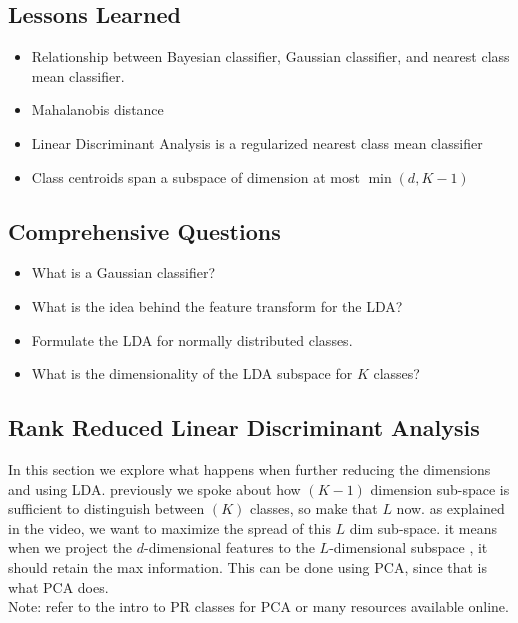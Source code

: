   \subsection{Lessons Learned}
\begin{itemize}
    \item Relationship between Bayesian classifier, Gaussian classifier, and nearest class mean classifier. 
    \item Mahalanobis distance 
    \item Linear Discriminant Analysis is a regularized nearest class mean classifier 
    \item Class centroids span a subspace of dimension at most $\min(d,K-1)$ 
  \end{itemize}
  
  \subsection{Comprehensive Questions}
  \begin{itemize}
    \item What is a Gaussian classifier? 
    \item What is the idea behind the feature transform for the LDA? 
    \item Formulate the LDA for normally distributed classes. 
    \item What is the dimensionality of the LDA subspace for $K$ classes?
  \end{itemize}
  
  \subsection{Rank Reduced Linear Discriminant Analysis}

In this section we explore what happens when further reducing the dimensions and using LDA. previously we spoke about how $(K-1)$ dimension sub-space is sufficient to distinguish between $(K)$ classes, so make that $L$ now. as explained in the video, we want to maximize the spread of this $L$ dim sub-space. it means when we project the $d$-dimensional features to the $L$-dimensional subspace , it should retain the max information. This can be done using PCA, since that is what PCA does. \\
Note: refer to the intro to PR classes for PCA or many resources available online. 

